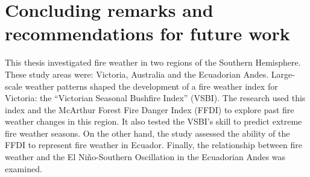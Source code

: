 
\chapter{Concluding remarks and recommendations for future work}
\newpage{}

This thesis investigated fire weather in two regions of the Southern
Hemisphere. These study areas were: Victoria, Australia and the Ecuadorian
Andes. Large-scale weather patterns shaped the development of a fire
weather index for Victoria: the ``Victorian Seasonal Bushfire Index''
(VSBI). The research used this index and the McArthur Forest Fire
Danger Index (FFDI) to explore past fire weather changes in this region.
It also tested the VSBI's skill to predict extreme fire weather seasons.
On the other hand, the study assessed the ability of the FFDI to represent
fire weather in Ecuador. Finally, the relationship between fire weather
and the El Ni\~no-Southern Oscillation in the Ecuadorian Andes was examined.

